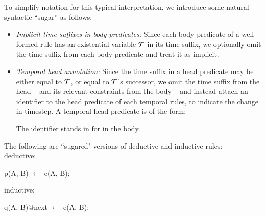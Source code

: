 To simplify \slang notation for this typical interpretation,  we introduce
some natural syntactic ``sugar'' as follows:

\begin{itemize}
%
%
\item {\em Implicit time-suffixes in body predicates:} Since each body
predicate of a well-formed rule has an existential variable $\Tau$ in its
time suffix, we optionally omit the time suffix from each body predicate and treat
it as implicit.
%
\item {\em Temporal head annotation:} Since the time suffix in a head predicate
may be either equal to $\Tau$, or equal to $\Tau$'s successor, we omit the time
suffix from the head -- and its relevant constraints from the body -- and
instead attach an identifier to the head predicate of each temporal rules, to indicate the change in
timestep.  A temporal head predicate is of the form:


The identifier  stands in for  in
the body.

%
%
%
%
%
\end{itemize}


\begin{example}
The following are ``sugared" versions of deductive and inductive rules:
\\
deductive:
\begin{Dedalus}
p(A, B) \(\leftarrow\) e(A, B);
\end{Dedalus}
inductive:
\begin{Dedalus}
q(A, B)@next \(\leftarrow\) e(A, B);
\end{Dedalus}
\end{example}


